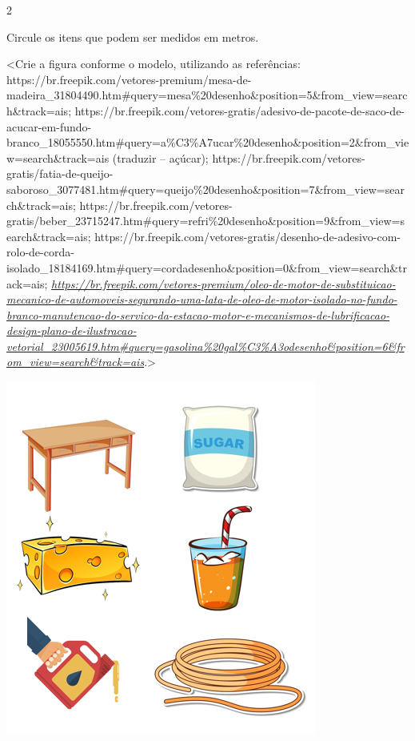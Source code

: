 {\num{2}

Circule os itens que podem ser medidos em metros.

\textless{}Crie a figura conforme o modelo, utilizando as referências:
https://br.freepik.com/vetores-premium/mesa-de-madeira\_31804490.htm\#query=mesa\%20desenho\&position=5\&from\_view=search\&track=ais;
https://br.freepik.com/vetores-gratis/adesivo-de-pacote-de-saco-de-acucar-em-fundo-branco\_18055550.htm\#query=a\%C3\%A7ucar\%20desenho\&position=2\&from\_view=search\&track=ais
(traduzir -- açúcar);
https://br.freepik.com/vetores-gratis/fatia-de-queijo-saboroso\_3077481.htm\#query=queijo\%20desenho\&position=7\&from\_view=search\&track=ais;
https://br.freepik.com/vetores-gratis/beber\_23715247.htm\#query=refri\%20desenho\&position=9\&from\_view=search\&track=ais;
https://br.freepik.com/vetores-gratis/desenho-de-adesivo-com-rolo-de-corda-isolado\_18184169.htm\#query=cordadesenho\&position=0\&from\_view=search\&track=ais;
\href{https://br.freepik.com/vetores-premium/oleo-de-motor-de-substituicao-mecanico-de-automoveis-segurando-uma-lata-de-oleo-de-motor-isolado-no-fundo-branco-manutencao-do-servico-da-estacao-motor-e-mecanismos-de-lubrificacao-design-plano-de-ilustracao-vetorial_23005619.htm\#query=gasolina\%20gal\%C3\%A3odesenho\&position=6\&from_view=search\&track=ais}{\emph{https://br.freepik.com/vetores-premium/oleo-de-motor-de-substituicao-mecanico-de-automoveis-segurando-uma-lata-de-oleo-de-motor-isolado-no-fundo-branco-manutencao-do-servico-da-estacao-motor-e-mecanismos-de-lubrificacao-design-plano-de-ilustracao-vetorial\_23005619.htm\#query=gasolina\%20gal\%C3\%A3odesenho\&position=6\&from\_view=search\&track=ais}}.\textgreater{}

\includegraphics[width=4.02139in,height=4.59439in]{media/image24.png}

}
